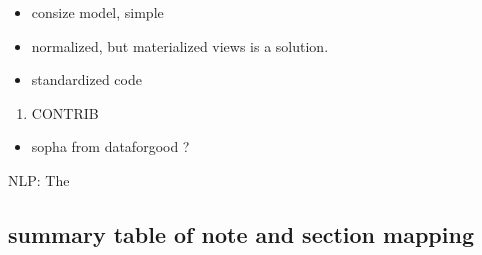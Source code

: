 \begin{itemize}
\tightlist
\item
  consize model, simple
\item
  normalized, but materialized views is a solution.
\item
  standardized code
\end{itemize}

\begin{enumerate}
\def\labelenumi{\arabic{enumi}.}
\setcounter{enumi}{2}
\tightlist
\item
  CONTRIB
\end{enumerate}

\begin{itemize}
\tightlist
\item
  sopha from dataforgood ?
\end{itemize}

NLP: The

\subsection{summary table of note and section
mapping}\label{summary-table-of-note-and-section-mapping}

